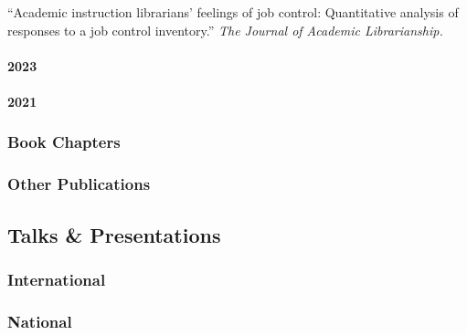 \documentclass[
  letterpaper,
  DIV=11,
  numbers=noendperiod]{scrartcl}
\let\oldparagraph\paragraph
\renewcommand{\paragraph}[1]{\oldparagraph{#1}\mbox{}}
\begin{document}
\label{published-papers-2024}

``Academic instruction librarians' feelings of job control: Quantitative
analysis of responses to a job control inventory.'' \emph{The Journal of
Academic Librarianship.}

\paragraph{2023}\label{section-1}

\label{published-papers-2023}

\paragraph{2021}\label{section-2}

\label{published-papers-2021}

\subsubsection{\texorpdfstring{ Book
Chapters}{ Book Chapters}}\label{book-chapters}

\label{book-chapters}

\subsubsection{\texorpdfstring{ Other
Publications}{ Other Publications}}\label{other-publications}

\label{other}

\subsection{\texorpdfstring{ Talks \&
Presentations}{ Talks \& Presentations}}\label{talks-presentations}

\subsubsection{International}\label{international}

\label{talks-international}

\subsubsection{National}\label{national}

\label{talks-national}
\end{document}
